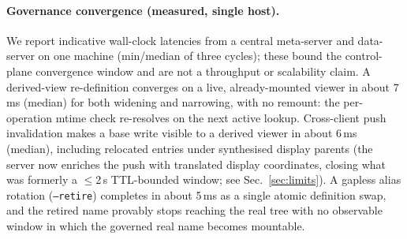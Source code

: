 \documentclass[numberedsection,acmtos]{acmart}
\begin{document}
\paragraph{Governance convergence (measured, single host).}
We report indicative wall-clock latencies from a central meta-server and
data-server on one machine (min/median of three cycles); these bound the
control-plane convergence window and are not a throughput or scalability claim.
A derived-view re-definition converges on a
live, already-mounted viewer in about 7\,ms (median) for both widening and
narrowing, with no remount: the per-operation mtime check re-resolves on the
next active lookup. Cross-client push invalidation makes a base
write visible to a derived viewer in about 6\,ms (median), including relocated
entries under synthesised display parents (the server now enriches the push
with translated display coordinates, closing what was formerly a $\leq$2\,s
TTL-bounded window; see Sec.~\ref{sec:limits}). A gapless alias
rotation (\texttt{--retire}) completes in about 5\,ms as a single atomic
definition swap, and the retired name provably stops reaching the real tree with
no observable window in which the governed real name becomes mountable.
\end{document}
